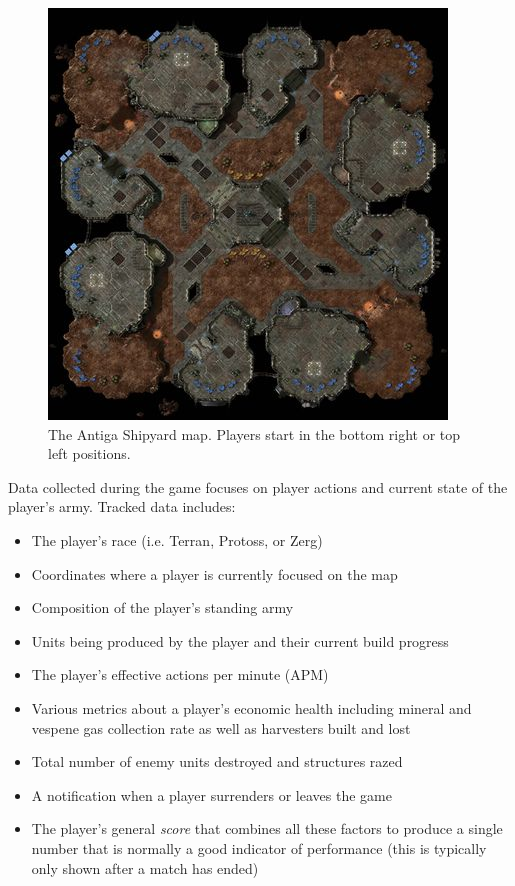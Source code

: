 \documentclass{nime-document-class}
\begin{document}
\begin{figure}[htbp]
	\centering
		\includegraphics[width=1\columnwidth]{antiga-shipyard.jpeg}
	\caption{The Antiga Shipyard map. Players start in the bottom right or top left positions.}
	\label{fig:AntigaShipyardFigure}
\end{figure}

Data collected during the game focuses on player actions and current state of the player's army.
Tracked data includes:
\begin{itemize} \itemsep1pt \parskip0pt 
  \item The player's race (i.e. Terran, Protoss, or Zerg)
  \item Coordinates where a player is currently focused on the map
  \item Composition of the player's standing army
  \item Units being produced by the player and their current build progress
  \item The player's effective actions per minute (APM)
  \item Various metrics about a player's economic health including mineral and vespene gas collection rate as well as harvesters built and lost
  \item Total number of enemy units destroyed and structures razed
  \item A notification when a player surrenders or leaves the game
  \item The player's general {\em score} that combines all these factors to produce a single number that is normally a good indicator of performance (this is typically only shown after a match has ended)
\end{itemize}
\end{document}
